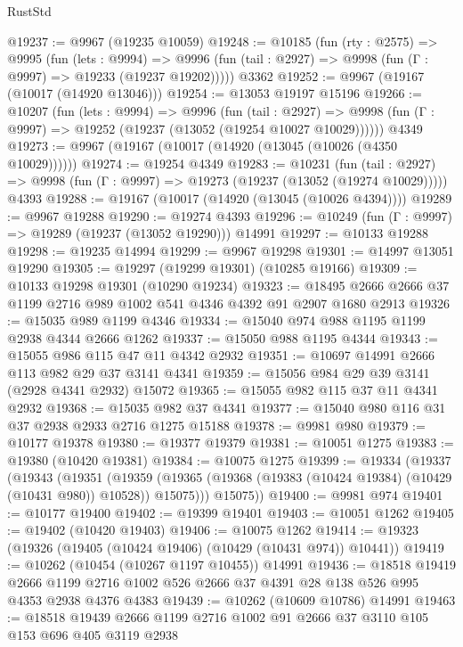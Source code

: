 \begin{lexlean}{RustStd}
\begin{coremodule}
@19237 := @9967 (@19235 @10059)
@19248 := @10185
    (fun (rty : @2575) =>
    @9995
      (fun (lets : @9994) =>
      @9996 (fun (tail : @2927) => @9998 (fun (Γ : @9997) => @19233 (@19237 @19202)))))
    @3362
@19252 := @9967 (@19167 (@10017 (@14920 @13046)))
@19254 := @13053 @19197 @15196
@19266 := @10207
    (fun (lets : @9994) =>
    @9996
      (fun (tail : @2927) =>
      @9998 (fun (Γ : @9997) => @19252 (@19237 (@13052 (@19254 @10027 @10029))))))
    @4349
@19273 := @9967 (@19167 (@10017 (@14920 (@13045 (@10026 (@4350 @10029))))))
@19274 := @19254 @4349
@19283 := @10231
    (fun (tail : @2927) => @9998 (fun (Γ : @9997) => @19273 (@19237 (@13052 (@19274 @10029)))))
    @4393
@19288 := @19167 (@10017 (@14920 (@13045 (@10026 @4394))))
@19289 := @9967 @19288
@19290 := @19274 @4393
@19296 := @10249 (fun (Γ : @9997) => @19289 (@19237 (@13052 @19290))) @14991
@19297 := @10133 @19288
@19298 := @19235 @14994
@19299 := @9967 @19298
@19301 := @14997 @13051 @19290
@19305 := @19297 (@19299 @19301) (@10285 @19166)
@19309 := @10133 @19298 @19301 (@10290 @19234)
@19323 := @18495 @2666 @2666 @37 @1199 @2716 @989 @1002 @541 @4346 @4392 @91 @2907 @1680 @2913
@19326 := @15035 @989 @1199 @4346
@19334 := @15040 @974 @988 @1195 @1199 @2938 @4344 @2666 @1262
@19337 := @15050 @988 @1195 @4344
@19343 := @15055 @986 @115 @47 @11 @4342 @2932
@19351 := @10697 @14991 @2666 @113 @982 @29 @37 @3141 @4341
@19359 := @15056 @984 @29 @39 @3141 (@2928 @4341 @2932) @15072
@19365 := @15055 @982 @115 @37 @11 @4341 @2932
@19368 := @15035 @982 @37 @4341
@19377 := @15040 @980 @116 @31 @37 @2938 @2933 @2716 @1275 @15188
@19378 := @9981 @980
@19379 := @10177 @19378
@19380 := @19377 @19379
@19381 := @10051 @1275
@19383 := @19380 (@10420 @19381)
@19384 := @10075 @1275
@19399 := @19334
    (@19337
      (@19343
        (@19351
          (@19359 (@19365 (@19368 (@19383 (@10424 @19384) (@10429 (@10431 @980)) @10528)) @15075)))
        @15075))
@19400 := @9981 @974
@19401 := @10177 @19400
@19402 := @19399 @19401
@19403 := @10051 @1262
@19405 := @19402 (@10420 @19403)
@19406 := @10075 @1262
@19414 := @19323 (@19326 (@19405 (@10424 @19406) (@10429 (@10431 @974)) @10441))
@19419 := @10262 (@10454 (@10267 @1197 @10455)) @14991
@19436 := @18518
    @19419
    @2666
    @1199
    @2716
    @1002
    @526
    @2666
    @37
    @4391
    @28
    @138
    @526
    @995
    @4353
    @2938
    @4376
    @4383
@19439 := @10262 (@10609 @10786) @14991
@19463 := @18518
    @19439
    @2666
    @1199
    @2716
    @1002
    @91
    @2666
    @37
    @3110
    @105
    @153
    @696
    @405
    @3119
    @2938

\end{coremodule}
\end{lexlean}
